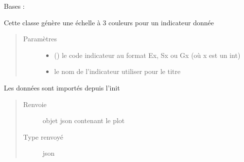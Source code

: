 \documentclass[letterpaper,10pt,french]{sphinxmanual}
\begin{document}
\begin{fulllineitems}
\label{\detokenize{app.home.content_gen:app.home.content_gen.graph_generation.BulletChart}}
\sphinxAtStartPar
Bases : 

\sphinxAtStartPar
Cette classe génère une échelle à 3 couleurs pour un indicateur donnée
\begin{quote}\begin{description}
\item[{Paramètres}] \leavevmode\begin{itemize}
\item {} 
\sphinxAtStartPar
{} () \textendash{} le code indicateur au format Ex, Sx ou Gx (où x est un int)

\item {} 
\sphinxAtStartPar
{} \textendash{} le nom de l’indicateur utiliser pour le titre

\end{itemize}

\end{description}\end{quote}

\begin{fulllineitems}
\label{\detokenize{app.home.content_gen:app.home.content_gen.graph_generation.BulletChart.plot}}
\sphinxAtStartPar
Les données sont importés depuis l’init
\begin{quote}\begin{description}
\item[{Renvoie}] \leavevmode
\sphinxAtStartPar
objet json contenant le plot

\item[{Type renvoyé}] \leavevmode
\sphinxAtStartPar
json

\end{description}\end{quote}

\end{fulllineitems}


\end{fulllineitems}
\end{document}
